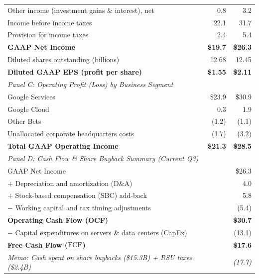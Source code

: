 \begin{table}[htbp]
\begin{tabular}{lrr}
Other income (investment gains \& interest), net & 0.8   & 3.2    \\
Income before income taxes                      & 22.1   & 31.7   \\
Provision for income taxes                      & 2.4    & 5.4    \\
\textbf{GAAP Net Income}                        & \textbf{\$19.7} & \textbf{\$26.3} \\
Diluted shares outstanding (billions)           & 12.68  & 12.45  \\
\textbf{Diluted GAAP EPS (profit per share)}    & \textbf{\$1.55} & \textbf{\$2.11} \\
\midrule
\multicolumn{3}{l}{\emph{Panel C: Operating Profit (Loss) by Business Segment}} \\
Google Services                                 & \$23.9 & \$30.9 \\
Google Cloud                                    & 0.3    & 1.9    \\
Other Bets                                      & (1.2)  & (1.1)  \\
Unallocated corporate headquarters costs        & (1.7)  & (3.2)  \\
\textbf{Total GAAP Operating Income}            & \textbf{\$21.3} & \textbf{\$28.5} \\
\midrule
\multicolumn{3}{l}{\emph{Panel D: Cash Flow \& Share Buyback Summary (Current Q3)}} \\
GAAP Net Income                                 &        & \$26.3 \\
$+$ Depreciation and amortization (D\&A)        &        & 4.0    \\
$+$ Stock-based compensation (SBC) add-back     &        & 5.8    \\
$-$ Working capital and tax timing adjustments  &        & (5.4)  \\
\textbf{Operating Cash Flow (OCF)}              &        & \textbf{\$30.7} \\
$-$ Capital expenditures on servers \& data centers (CapEx) & & (13.1) \\
\textbf{Free Cash Flow ($\operatorname{FCF}$)}                &        & \textbf{\$17.6} \\
\emph{Memo: Cash spent on share buybacks (\$15.3B) + RSU taxes (\$2.4B)} & & \emph{(17.7)} \\
\bottomrule
\end{tabular}
\end{table}

